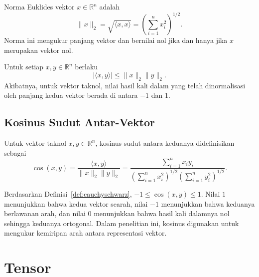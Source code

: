 \begin{definisi}
\label{def:normaeuklides}
Norma Euklides vektor $x\in\mathbb{R}^{n}$ adalah
\begin{equation}
\lVert x\rVert_2
=\sqrt{\langle x,x\rangle}
=\left(\sum_{i=1}^{n}x_i^2\right)^{1/2}.
\label{eq:normaeuklides}
\end{equation}
Norma ini mengukur panjang vektor dan bernilai nol jika dan hanya jika
$x$ merupakan vektor nol.
\end{definisi}

\begin{definisi}
\label{def:cauchyschwarz}
Untuk setiap $x,y\in\mathbb{R}^{n}$ berlaku
\begin{equation}
|\langle x,y\rangle|
\leq \lVert x\rVert_2\lVert y\rVert_2.
\label{eq:cauchyschwarz}
\end{equation}
Akibatnya, untuk vektor taknol, nilai hasil kali dalam yang telah
dinormalisasi oleh panjang kedua vektor berada di antara $-1$ dan $1$.
\end{definisi}

\subsection{Kosinus Sudut Antar-Vektor}
\label{subsec:kosinus}

\begin{definisi}
\label{def:kosinus}
Untuk vektor taknol $x,y\in\mathbb{R}^{n}$, kosinus sudut antara
keduanya didefinisikan sebagai
\begin{equation}
\cos(x,y)
=\frac{\langle x,y\rangle}
{\lVert x\rVert_2\lVert y\rVert_2}
=\frac{\displaystyle\sum_{i=1}^{n}x_i y_i}
{\displaystyle
\left(\sum_{i=1}^{n}x_i^2\right)^{1/2}
\left(\sum_{i=1}^{n}y_i^2\right)^{1/2}}.
\label{eq:kosinus}
\end{equation}
\end{definisi}

Berdasarkan Definisi~\ref{def:cauchyschwarz},
$-1\leq\cos(x,y)\leq 1$. Nilai $1$ menunjukkan bahwa kedua vektor
searah, nilai $-1$ menunjukkan bahwa keduanya berlawanan arah, dan
nilai $0$ menunjukkan bahwa hasil kali dalamnya nol sehingga keduanya
ortogonal. Dalam penelitian ini, kosinus digunakan untuk mengukur
kemiripan arah antara representasi vektor.


\section{Tensor}
\label{sec:tensor}

